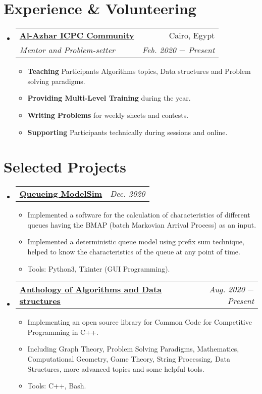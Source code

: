 \documentclass[letterpaper, 11pt]{article}
\makeatletter
\newcommand{\experienceItem}[4] {
  \vspace{-1pt}\item
  \begin{tabular*}{0.97\textwidth}[t]{l@{\extracolsep{\fill}}r}
    \textbf{#1} & #2 \\
    \textit{\small #3} & \textit{\small #4} \\
  \end{tabular*}\vspace{-5pt}
}
\newcommand{\experienceSubItem}[2] {\item\small{\textbf{#1}{#2 \vspace{-2pt}}}}
\newcommand{\projectItem}[2] {
  \vspace{-1pt}\item
  \begin{tabular*}{0.97\textwidth}[t]{l@{\extracolsep{\fill}}r}
    \textbf{#1} & \textit{\small #2} \\
  \end{tabular*}\vspace{-5pt}
}
\newcommand{\projectSubItem}[1] {\item\small{#1 \vspace{-2pt}}}
\makeatother
\begin{document}
\section{Experience \& Volunteering}
\begin{itemize}[leftmargin=*]
  \experienceItem{\faIcon{code} \href{https://sites.google.com/view/azharicpc/home}{Al-Azhar ICPC Community}}{Cairo, Egypt}{Mentor and Problem-setter}{Feb. 2020 $-$ Present}
  \begin{itemize}
    \experienceSubItem{Teaching}{ Participants Algorithms topics, Data structures and Problem solving paradigms.}
    \experienceSubItem{Providing Multi-Level Training}{ during the year.}
    \experienceSubItem{Writing Problems}{ for weekly sheets and contests.}
    \experienceSubItem{Supporting}{ Participants technically during sessions and online.}
  \end{itemize}\vspace{-5pt}
\end{itemize}

\section{Selected Projects}
\begin{itemize}[leftmargin=*]
  \projectItem{\faIcon{user-clock} \href{https://github.com/AbdeltwabMF/Queueing-ModelSim}{Queueing ModelSim}}{Dec. 2020}
  \begin{itemize}
    \projectSubItem{Implemented a software for the calculation of characteristics of different queues having the BMAP (batch Markovian Arrival Process) as an input.}
    \projectSubItem{Implemented a deterministic queue model using prefix sum technique, helped to know the characteristics of the queue at any point of time.}
    \projectSubItem{Tools: Python3, Tkinter (GUI Programming).}
  \end{itemize}\vspace{-5pt}

  \projectItem{\faIcon{laptop-code} \href{https://github.com/AbdeltwabMF/Anthology-of-Algorithms-and-Data-structures}{Anthology of Algorithms and Data structures}}{Aug. 2020 $-$ Present}
  \begin{itemize} 
    \projectSubItem{Implementing an open source library for Common Code for Competitive Programming in C++.}
    \projectSubItem{Including Graph Theory, Problem Solving Paradigms, Mathematics, Computational Geometry, Game Theory, String Processing, Data Structures, more advanced topics and some helpful tools.}
    \projectSubItem{Tools: C++, Bash.}
  \end{itemize}\vspace{-5pt}
\end{itemize}
\end{document}
